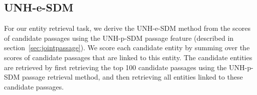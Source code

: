 \documentclass{article}
\begin{document}
\subsection{UNH-e-SDM}\label{sec:esdm}

For our entity retrieval task, we derive the UNH-e-SDM method from the scores of candidate passages using the UNH-p-SDM passage feature (described in section~\ref{sec:jointpassage}). We score each candidate entity by summing over the scores of candidate passages that are linked to this entity. The candidate entities are retrieved by first retrieving the top 100 candidate passages using the UNH-p-SDM passage retrieval method, and then retrieving all entities linked to these candidate passages.

%
%
\end{document}

